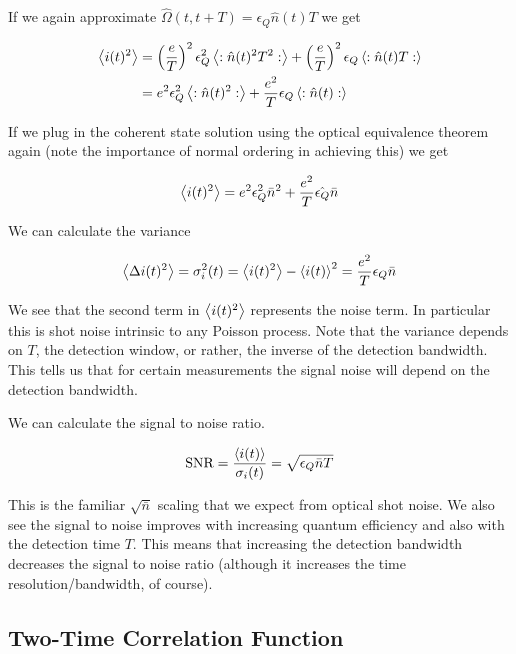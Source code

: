 \documentclass[12pt]{article}
\begin{document}
If we again approximate $\hat{\Omega}(t,t+T) = \epsilon_Q \hat{n}(t) T$ we get

\begin{align}
\Braket{i(t)^2} &= \left( \frac{e}{T} \right)^2 \epsilon_Q^2 \Braket{:\hat{n}(t)^2 T^2 :} + \left(\frac{e}{T}\right)^2 \epsilon_Q \Braket{:\hat{n}(t) T :}\\
&= e^2 \epsilon_Q^2 \Braket{:\hat{n}(t)^2:} + \frac{e^2}{T} \epsilon_Q\Braket{:\hat{n}(t):}
\end{align}

If we plug in the coherent state solution using the optical equivalence theorem again (note the importance of normal ordering in achieving this) we get

\begin{align}
\Braket{i(t)^2} = e^2 \epsilon_Q^2 \bar{n}^2 + \frac{e^2}{T} \hat{\epsilon_Q} \bar{n}
\end{align}

We can calculate the variance

\begin{align}
\Braket{\Delta i(t)^2} = \sigma_i^2(t) = \Braket{i(t)^2} - \Braket{i(t)}^2 = \frac{e^2}{T} \epsilon_Q \bar{n}
\end{align}

We see that the second term in $\Braket{i(t)^2}$ represents the noise term. In particular this is shot noise intrinsic to any Poisson process. Note that the variance depends on $T$, the detection window, or rather, the inverse of the detection bandwidth. This tells us that for certain measurements the signal noise will depend on the detection bandwidth.

 We can calculate the signal to noise ratio.

\begin{align}
\label{SNR}
\text{SNR} = \frac{\Braket{i(t)}}{\sigma_i(t)} = \sqrt{\epsilon_Q \bar{n} T}
\end{align}

This is the familiar $\sqrt{\bar{n}}$ scaling that we expect from optical shot noise. We also see the signal to noise improves with increasing quantum efficiency and also with the detection time $T$. This means that increasing the detection bandwidth decreases the signal to noise ratio (although it increases the time resolution/bandwidth, of course).

\subsection{Two-Time Correlation Function}
\end{document}
